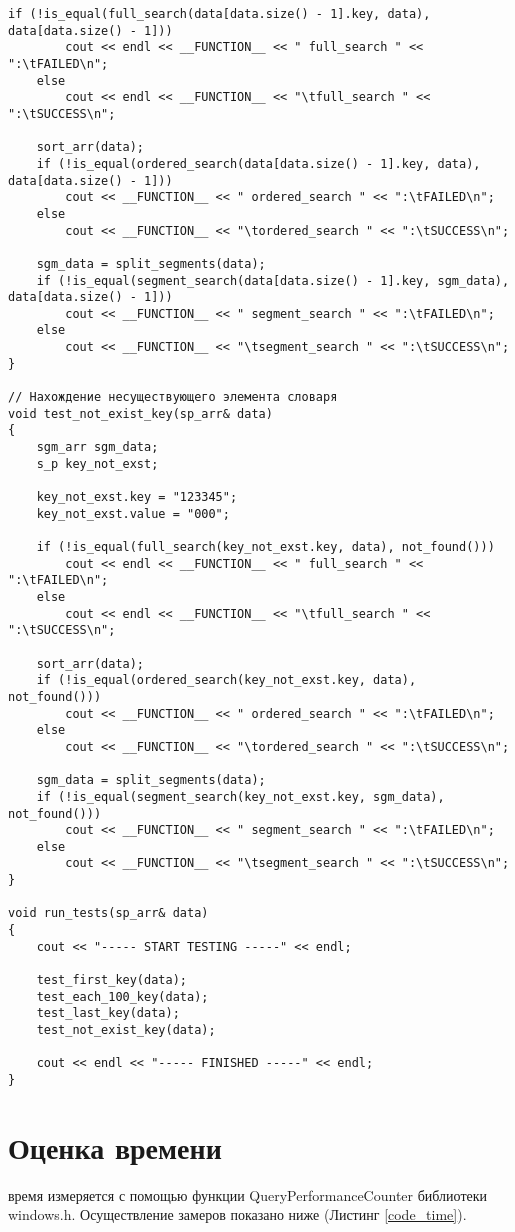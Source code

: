 \begin{lstlisting}[label=code_test, caption = Тесты]
	if (!is_equal(full_search(data[data.size() - 1].key, data), data[data.size() - 1]))
		cout << endl << __FUNCTION__ << " full_search " << ":\tFAILED\n";
	else
		cout << endl << __FUNCTION__ << "\tfull_search " << ":\tSUCCESS\n";
	
	sort_arr(data);
	if (!is_equal(ordered_search(data[data.size() - 1].key, data), data[data.size() - 1]))
		cout << __FUNCTION__ << " ordered_search " << ":\tFAILED\n";
	else
		cout << __FUNCTION__ << "\tordered_search " << ":\tSUCCESS\n";
	
	sgm_data = split_segments(data);
	if (!is_equal(segment_search(data[data.size() - 1].key, sgm_data), data[data.size() - 1]))
		cout << __FUNCTION__ << " segment_search " << ":\tFAILED\n";
	else
		cout << __FUNCTION__ << "\tsegment_search " << ":\tSUCCESS\n";
}

// Нахождение несуществующего элемента словаря
void test_not_exist_key(sp_arr& data)
{
	sgm_arr sgm_data;
	s_p key_not_exst;
	
	key_not_exst.key = "123345";
	key_not_exst.value = "000";
	
	if (!is_equal(full_search(key_not_exst.key, data), not_found()))
		cout << endl << __FUNCTION__ << " full_search " << ":\tFAILED\n";
	else
		cout << endl << __FUNCTION__ << "\tfull_search " << ":\tSUCCESS\n";
	
	sort_arr(data);
	if (!is_equal(ordered_search(key_not_exst.key, data), not_found()))
		cout << __FUNCTION__ << " ordered_search " << ":\tFAILED\n";
	else
		cout << __FUNCTION__ << "\tordered_search " << ":\tSUCCESS\n";
	
	sgm_data = split_segments(data);
	if (!is_equal(segment_search(key_not_exst.key, sgm_data), not_found()))
		cout << __FUNCTION__ << " segment_search " << ":\tFAILED\n";
	else
		cout << __FUNCTION__ << "\tsegment_search " << ":\tSUCCESS\n";
}

void run_tests(sp_arr& data)
{
	cout << "----- START TESTING -----" << endl;
	
	test_first_key(data);
	test_each_100_key(data);
	test_last_key(data);
	test_not_exist_key(data);
	
	cout << endl << "----- FINISHED -----" << endl;
}
\end{lstlisting}	

\section{Оценка времени}
 время измеряется с помощью функции QueryPerformanceCounter библиотеки windows.h. \cite{Query} Осуществление замеров показано ниже (Листинг \ref{code_time}).

